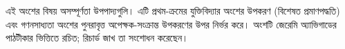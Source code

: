 \documentclass[../../include/open-logic-part]{subfiles}
\begin{document}

\begin{editorial}
 এই অংশের বিষয় অসম্পূর্ণতা উপপাদ্যগুলি। এটি প্রথম-ক্রমের যুক্তিবিদ্যার অংশের
 উপকরণ (বিশেষত প্রমাণপদ্ধতি) এবং গণনসাধ্যতা অংশের পুনরাবৃত্ত অপেক্ষক-সংক্রান্ত
 উপকরণের উপর নির্ভর করে। অংশটি জেরেমি অ্যাভিগাডের পাঠটীকার ভিত্তিতে রচিত;
 রিচার্ড জাখ তা সংশোধন করেছেন।
\end{editorial}






\OLEndPartHook
\end{document}

